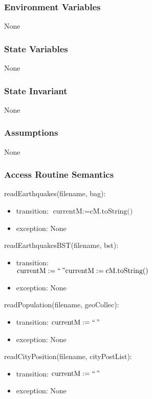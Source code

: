 \documentclass[12pt]{article}
\begin{document}
\subsubsection* {Environment Variables}

None

\subsubsection* {State Variables}

None

\subsubsection* {State Invariant}

None

\subsubsection* {Assumptions}

None

\subsubsection* {Access Routine Semantics}

\noindent readEarthquakes(filename, bag):
\begin{itemize}
\item transition: $\mbox{currentM} := \mbox{cM.toString()}$
\item exception: None
\end{itemize}

\noindent readEarthquakesBST(filename, bst):
\begin{itemize}
\item transition: \\ $\mbox{currentM} := ` ` \,  " \\
\mbox{currentM} := \mbox{cM.toString()}$
\item exception: None
\end{itemize}

\noindent readPopulation(filename, geoCollec):
\begin{itemize}
\item transition: $\mbox{currentM} := ` ` \,  "$
\item exception: None
\end{itemize}

\noindent readCityPosition(filename, cityPostList):
\begin{itemize}
\item transition: $\mbox{currentM} := ` ` \,  "$
\item exception: None
\end{itemize}
\end{document}
